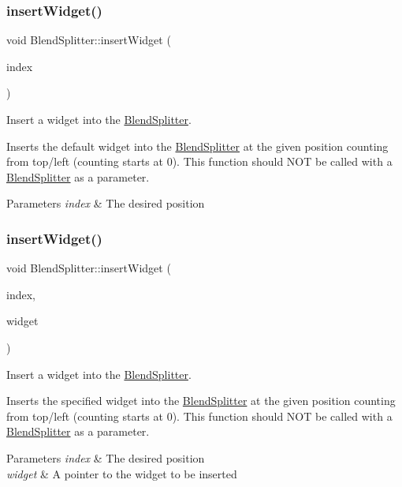 \subsubsection{\texorpdfstring{insert\+Widget()}{insertWidget()}\hspace{0.1cm}{\footnotesize\ttfamily [1/3]}}
{\footnotesize\ttfamily void Blend\+Splitter\+::insert\+Widget (\begin{DoxyParamCaption}\item[{int}]{index }\end{DoxyParamCaption})}



Insert a widget into the \hyperlink{class_blend_splitter}{Blend\+Splitter}. 

Inserts the default widget into the \hyperlink{class_blend_splitter}{Blend\+Splitter} at the given position counting from top/left (counting starts at 0). This function should N\+OT be called with a \hyperlink{class_blend_splitter}{Blend\+Splitter} as a parameter. 
\begin{DoxyParams}{Parameters}
{\em index} & The desired position \\
\hline
\end{DoxyParams}
\hypertarget{class_blend_splitter_a9c15101a7a0acb30f6cd46ff5259af79}{}\label{class_blend_splitter_a9c15101a7a0acb30f6cd46ff5259af79} 
\subsubsection{\texorpdfstring{insert\+Widget()}{insertWidget()}\hspace{0.1cm}{\footnotesize\ttfamily [2/3]}}
{\footnotesize\ttfamily void Blend\+Splitter\+::insert\+Widget (\begin{DoxyParamCaption}\item[{int}]{index,  }\item[{Q\+Widget $\ast$}]{widget }\end{DoxyParamCaption})}



Insert a widget into the \hyperlink{class_blend_splitter}{Blend\+Splitter}. 

Inserts the specified widget into the \hyperlink{class_blend_splitter}{Blend\+Splitter} at the given position counting from top/left (counting starts at 0). This function should N\+OT be called with a \hyperlink{class_blend_splitter}{Blend\+Splitter} as a parameter. 
\begin{DoxyParams}{Parameters}
{\em index} & The desired position \\
\hline
{\em widget} & A pointer to the widget to be inserted \\
\hline
\end{DoxyParams}
\hypertarget{class_blend_splitter_a9be82fb24eb94d1b9885cca3488e47e9}{}\label{class_blend_splitter_a9be82fb24eb94d1b9885cca3488e47e9} 
